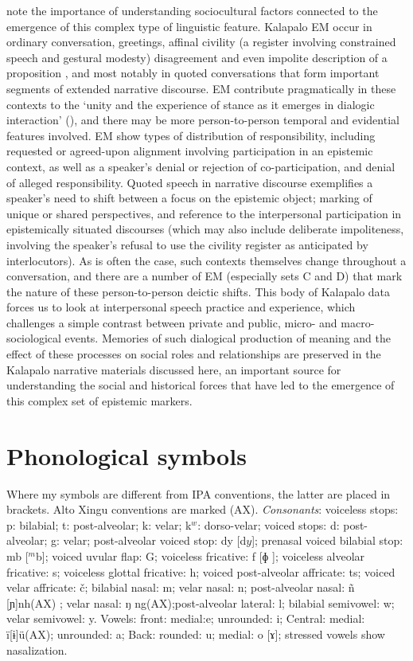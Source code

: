 \documentclass[output=paper]{langsci/langscibook}
\begin{document}
\cite{NuckollsLev2012}  note the importance of understanding sociocultural factors connected to the emergence of this complex type of linguistic feature.   Kalapalo EM occur in ordinary conversation, greetings, affinal civility (a register involving constrained speech and gestural modesty)  disagreement and even impolite description of a proposition ,  and most notably in quoted conversations that form important segments of extended narrative discourse.  EM contribute pragmatically in these contexts to the ‘unity and the experience of stance as it emerges in dialogic interaction’ (\citealt[35]{DuBois2007}), and there may be more person-to-person temporal and evidential features involved.  EM show types of distribution of responsibility, including requested or agreed-upon  alignment involving participation in an epistemic context,  as well as a speaker’s denial or rejection of co-participation, and denial of alleged responsibility.  Quoted speech in narrative discourse exemplifies a speaker’s need to shift between a focus on the epistemic object; marking of unique or shared perspectives, and reference to the interpersonal participation in epistemically situated discourses (which may also include deliberate impoliteness, involving the speaker’s  refusal to use the civility register as anticipated by interlocutors).  As is often the case, such contexts themselves change throughout a conversation, and there are a number of EM (especially sets C and D) that mark the nature of these person-to-person deictic shifts. This body of Kalapalo data forces us to look at interpersonal speech practice and experience,  which challenges a  simple contrast between private and public, micro- and macro-sociological events.  Memories of such dialogical production of meaning and the effect of these processes on social roles and relationships are preserved in the Kalapalo narrative materials discussed here, an important source for understanding the social and historical forces that have led to the emergence of this complex set of epistemic markers.

\section*{Phonological symbols}

Where my symbols are different from IPA conventions, the latter are placed in brackets. Alto Xingu conventions are marked (AX). \textit{Consonants}: voiceless stops: p: bilabial; t: post-alveolar; k: velar; k$^w$: dorso-velar; voiced stops: d: post-alveolar; g: velar; post-alveolar voiced stop: dy [d$y$]; prenasal voiced bilabial stop: mb [$^m$b]; voiced uvular flap: G; voiceless fricative: f [ɸ ]; voiceless alveolar fricative: s; voiceless glottal fricative: h; voiced post-alveolar affricate: ts; voiced velar affricate: č; bilabial nasal: m; velar nasal: n; post-alveolar nasal: ñ [ɲ]nh(AX) ; velar nasal: ŋ ng(AX);post-alveolar lateral: l; bilabial semivowel: w; velar semivowel: y. Vowels: front: medial:e; unrounded: i;  Central: medial: ï[ɨ]ü(AX); unrounded: a; Back: rounded: u; medial: o [ɤ]; stressed vowels show nasalization.
 
\end{document}
